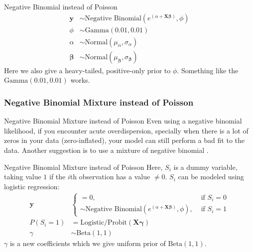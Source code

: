\begin{frame}{Negative Binomial instead of Poisson}
	$$
		\begin{aligned}
			\mathbf{y}         & \sim \text{Negative Binomial} \left( e^{(\alpha + \mathbf{X} \boldsymbol{\beta})}, \phi \right) \\
			\phi               & \sim \text{Gamma}(0.01, 0.01)                                                                   \\
			\alpha             & \sim \text{Normal}(\mu_\alpha, \sigma_\alpha)                                                   \\
			\boldsymbol{\beta} & \sim \text{Normal}(\mu_{\boldsymbol{\beta}}, \sigma_{\boldsymbol{\beta}})
		\end{aligned}
	$$
	\vfill
	Here we also give a heavy-tailed, positive-only prior to $\phi$.
	Something like the $\text{Gamma}(0.01, 0.01)$ works.
\end{frame}

\subsubsection{Negative Binomial Mixture instead of Poisson}
\begin{frame}{Negative Binomial Mixture instead of Poisson}
	Even using a negative binomial likelihood,
	if you encounter acute overdispersion,
	specially when there is a lot of zeros in your data
	(zero-inflated),
	your model can still perform a bad fit to the data.
	\vfill
	Another suggestion is to use a mixture of negative binomial
	\parencite{mcelreath2020statistical}.
\end{frame}

\begin{frame}{Negative Binomial Mixture instead of Poisson}
	Here, $S_i$ is a dummy variable,
	taking value $1$ if the $i$th observation has a value $\neq 0$.
	$S_i$ can be modeled using logistic regression:
	$$
		\begin{aligned}
			\mathbf{y}
			           & \begin{cases}
				             = 0,                                                                                             & \text{ if } S_i = 0 \\
				             \sim \text{Negative Binomial} \left( e^{(\alpha + \mathbf{X} \boldsymbol{\beta})}, \phi \right), & \text{ if } S_i = 1
			             \end{cases} \\
			P(S_i = 1) & = \text{Logistic/Probit}(\mathbf{X} \boldsymbol{\gamma})                                                               \\
			\gamma     & \sim \text{Beta}(1, 1)
		\end{aligned}
	$$
	\vfill
	$\gamma$ is a new coefficients which we give uniform prior of $\text{Beta} (1, 1)$.
\end{frame}

